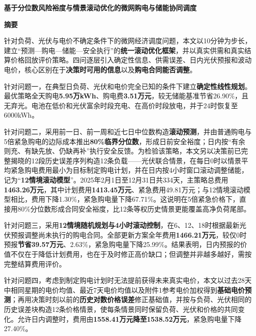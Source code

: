 \documentclass[UTF8,fontset=none,12pt,a4paper]{ctexart}
\begin{document}
\setcounter{page}{1}
\begin{center}
{\fontsize{15.8pt}{20pt}\selectfont\bfseries 基于分位数风险裕度与情景滚动优化的微网购电与储能协同调度}\par
\vspace{0.6em}
{\large\bfseries 摘\quad 要}
\end{center}
\begingroup{}

针对负荷、光伏与电价不确定条件下的微网经济调度问题，本文以10分钟为步长，建立“预测—购电—储能—安全执行”的\textbf{统一滚动优化框架}，并以真实供需和真实结算价格回放评价策略。四问逐层引入确定性信息、供需误差、日内光伏预报和波动电价，核心区别在于\textbf{决策时可用的信息}以及\textbf{购电合同能否调整}。

针对问题一，在典型日负荷、光伏和电价完全已知的条件下建立\textbf{确定性线性规划}。最优策略全天购电\textbf{5.95万kWh}、购电费\textbf{3.51万元}，较无储能基准节省26.90\%，且无弃光。电池在低价和光伏富余时段充电、在高价时段放电，并于24时恢复至6000kWh。

针对问题二，采用前一日、前一周和近七日中位数构造\textbf{滚动预测}，并由普通购电与5倍紧急购电的边际成本推出\textbf{80\%临界分位数}，形成日前安全裕度；日内按“有余则充、有缺先放、仍缺再补”执行安全反馈。为检验该策略，本文另以决策前已完整揭晓的12段历史误差序列构造12条负载——光伏联合情景，在每日0时以情景平均紧急购电费用最小为目标制定购电计划，并在日内按4小时窗口滚动调整储能，记为“\textbf{12情境滚动模型}”。2025年2月1日至12月31日共334天，主策略总费用\textbf{1463.26万元}，其中计划费用\textbf{1413.45万元}、紧急费用49.81万元；与12情境滚动模型相比，费用下降1.30\%，紧急购电量下降67.71\%。这说明在5倍紧急价格下，直接用80\%分位数形成合同安全裕度，比12条等权历史情景更能覆盖高净负荷尾部。

针对问题三，采用\textbf{12情境随机规划与4小时滚动控制}，在6、12、18时根据最新光伏预报调整尚未执行的购电合同。全部更新方案全年费用\textbf{1466.21万元}，较仅0时预报\textbf{节省39.57万元}、2.63\%，紧急购电量下降25.99\%。结果表明，日内预报的价值不仅在于降低计划费用，也在于及时修正高价缺口；但调整并非越多越好，需按完整结算费用评价。

针对问题四，考虑到制定购电计划时无法提前获得未来真实电价，本文以过去28天中相同星期的电价均值、最近7天电价均值以及附件1参考电价加权得到\textbf{基础电价预测}；再用决策时刻以前的\textbf{历史对数价格误差}修正基础值，并按与负荷、光伏相同的历史误差块构造12条价格情景，使每条情景同时保留负荷、光伏和价格的共同变化。允许日内调整时，费用由\textbf{1558.41万元降至1538.52万元}，紧急购电量下降27.40\%。
\end{document}
